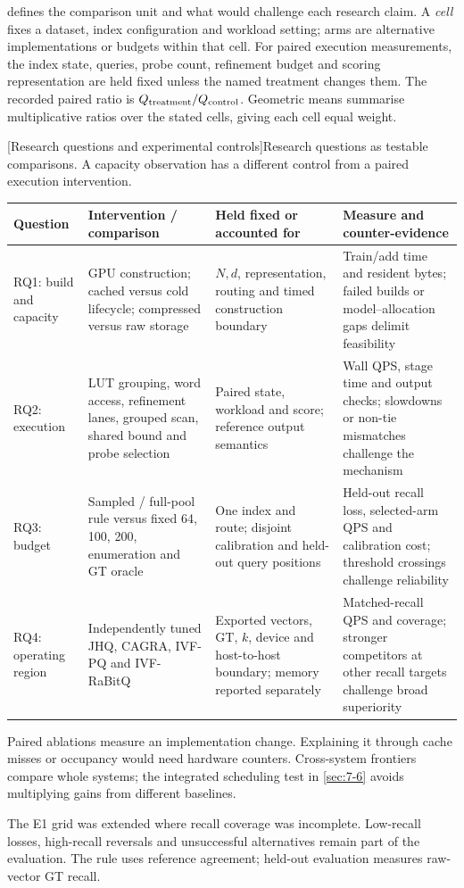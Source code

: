  defines the comparison unit and what would challenge
each research claim. A \emph{cell} fixes a dataset, index configuration and
workload setting; arms are alternative implementations or budgets within
that cell. For paired execution measurements, the index state, queries,
probe count, refinement budget and scoring representation are held fixed
unless the named treatment changes them. The recorded paired ratio is
$Q_{\rm treatment}/Q_{\rm control}$. Geometric means summarise multiplicative
ratios over the stated cells, giving each cell equal weight.

\par\medskip\noindent\begin{minipage}{\linewidth}
\centering\captionsetup{hypcap=false}
[Research questions and experimental controls]{Research questions as testable comparisons. A capacity observation
has a different control from a paired execution intervention.}
\label{tab:3-design}
\footnotesize\setlength{\tabcolsep}{3pt}
\begin{tabularx}{\linewidth}{@{}>{\raggedright\arraybackslash}p{.11\linewidth}*{3}{>{\raggedright\arraybackslash}X}@{}}
\toprule
Question & Intervention / comparison & Held fixed or accounted for & Measure and counter-evidence \\
\midrule
RQ1: build and capacity & GPU construction; cached versus cold lifecycle;
compressed versus raw storage & $N,d$, representation, routing and timed
construction boundary & Train/add time and resident bytes; failed builds
or model--allocation gaps delimit feasibility \\
RQ2: execution & LUT grouping, word access, refinement lanes, grouped scan,
shared bound and probe selection & Paired state, workload and score;
reference output semantics & Wall QPS, stage time and output checks;
slowdowns or non-tie mismatches challenge the mechanism \\
RQ3: budget & Sampled / full-pool rule versus fixed 64, 100, 200,
enumeration and GT oracle & One index and route; disjoint calibration
and held-out query positions & Held-out recall loss, selected-arm QPS
and calibration cost; threshold crossings challenge reliability \\
RQ4: operating region & Independently tuned JHQ, CAGRA, IVF-PQ and
IVF-RaBitQ & Exported vectors, GT, $k$, device and host-to-host boundary;
memory reported separately & Matched-recall QPS and coverage; stronger
competitors at other recall targets challenge broad superiority \\
\bottomrule
\end{tabularx}
\end{minipage}\par\medskip

Paired ablations measure an implementation change. Explaining it through cache misses or occupancy would need hardware counters. Cross-system frontiers compare whole systems; the integrated scheduling test in \cref{sec:7-6} avoids multiplying gains from different baselines.

The E1 grid was extended where recall coverage was incomplete. Low-recall losses, high-recall
reversals and unsuccessful alternatives remain part of the evaluation.
The rule uses reference agreement; held-out evaluation measures raw-vector GT recall.